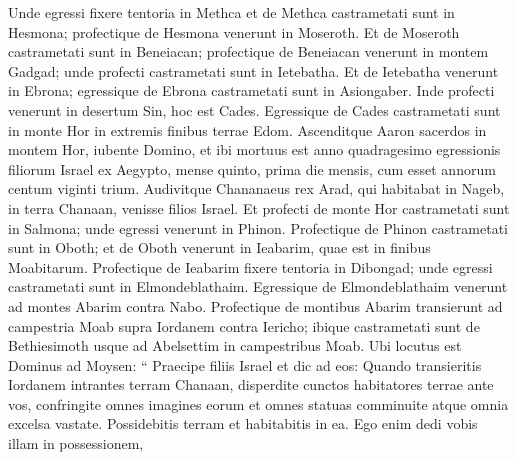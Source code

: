 \begin{biblechapter}
\begin{biblechapter}
\begin{biblechapter}
\begin{biblechapter}
\begin{biblechapter}
\begin{biblechapter}
\begin{biblechapter}
\begin{biblechapter}
\begin{biblechapter}
\begin{biblechapter}
\begin{biblechapter}
\begin{biblechapter}
\begin{biblechapter}
\begin{biblechapter}
\begin{biblechapter}
\begin{biblechapter}
\begin{biblechapter}
\begin{biblechapter}
\begin{biblechapter}
\begin{biblechapter}
\begin{biblechapter}
\begin{biblechapter}
\begin{biblechapter}
\begin{biblechapter}
\begin{biblechapter}
\begin{biblechapter}
\begin{biblechapter}
\begin{biblechapter}
\begin{biblechapter}
\begin{biblechapter}
\begin{biblechapter}
\begin{biblechapter}
\begin{biblechapter}
\verse Unde egressi fixere tentoria in Methca 
\verse et de Methca castrametati sunt in Hesmona; 
\verse profectique de Hesmona venerunt in Moseroth. 
\verse Et de Moseroth castrametati sunt in Beneiacan; 
\verse profectique de Beneiacan venerunt in montem Gadgad; 
 \verse unde profecti castrametati sunt in Ietebatha. 
\verse Et de Ietebatha venerunt in Ebrona; 
\verse egressique de Ebrona castrametati sunt in Asiongaber. 
\verse Inde profecti venerunt in desertum Sin, hoc est Cades.
 \verse Egressique de Cades castrametati sunt in monte Hor in extremis finibus terrae Edom. 
\verse Ascenditque Aaron sacerdos in montem Hor, iubente Domino, et ibi mortuus est anno quadragesimo egressionis filiorum Israel ex Aegypto, mense quinto, prima die mensis, 
\verse cum esset annorum centum viginti trium.
 \verse Audivitque Chananaeus rex Arad, qui habitabat in Nageb, in terra Chanaan, venisse filios Israel. 
\verse Et profecti de monte Hor castrametati sunt in Salmona; 
\verse unde egressi venerunt in Phinon. 
\verse Profectique de Phinon castrametati sunt in Oboth; 
\verse et de Oboth venerunt in Ieabarim, quae est in finibus Moabitarum. 
\verse Profectique de Ieabarim fixere tentoria in Dibongad; 
\verse unde egressi castrametati sunt in Elmondeblathaim. 
\verse Egressique de Elmondeblathaim venerunt ad montes Abarim contra Nabo. 
\verse Profectique de montibus Abarim transierunt ad campestria Moab supra Iordanem contra Iericho; 
\verse ibique castrametati sunt de Bethiesimoth usque ad Abelsettim in campestribus Moab.
 \verse Ubi locutus est Dominus ad Moysen: 
\verse “ Praecipe filiis Israel et dic ad eos: Quando transieritis Iordanem intrantes terram Chanaan, 
\verse disperdite cunctos habitatores terrae ante vos, confringite omnes imagines eorum et omnes statuas comminuite atque omnia excelsa vastate. 
\verse Possidebitis terram et habitabitis in ea. Ego enim dedi vobis illam in possessionem, 

\end{biblechapter}
\end{biblechapter}
\end{biblechapter}
\end{biblechapter}
\end{biblechapter}
\end{biblechapter}
\end{biblechapter}
\end{biblechapter}
\end{biblechapter}
\end{biblechapter}
\end{biblechapter}
\end{biblechapter}
\end{biblechapter}
\end{biblechapter}
\end{biblechapter}
\end{biblechapter}
\end{biblechapter}
\end{biblechapter}
\end{biblechapter}
\end{biblechapter}
\end{biblechapter}
\end{biblechapter}
\end{biblechapter}
\end{biblechapter}
\end{biblechapter}
\end{biblechapter}
\end{biblechapter}
\end{biblechapter}
\end{biblechapter}
\end{biblechapter}
\end{biblechapter}
\end{biblechapter}
\end{biblechapter}

